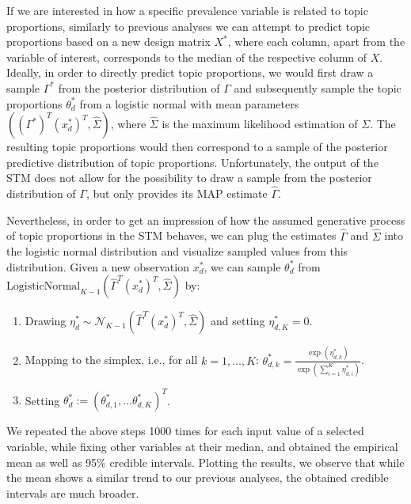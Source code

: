 If we are interested in how a specific prevalence variable is related to topic proportions, similarly to previous analyses we can attempt to predict topic proportions based on a new design matrix $X^*$, where each column, apart from the variable of interest, corresponds to the median of the respective column of $X$. Ideally, in order to directly predict topic proportions, we would first draw a sample $\Gamma^*$ from the posterior distribution of $\Gamma$ and subsequently sample the topic proportions $\theta_d^*$ from a logistic normal with mean parameters $((\Gamma^*)^T (x_d^*)^T, \hat{\Sigma})$, where $\hat{\Sigma}$ is the maximum likelihood estimation of $\Sigma$. The resulting topic proportions would then correspond to a sample of the posterior predictive distribution of topic proportions. Unfortunately, the output of the STM does not allow for the possibility to draw a sample from the posterior distribution of $\Gamma$, but only provides its MAP estimate $\hat{\Gamma}$. 

Nevertheless, in order to get an impression of how the assumed generative process of topic proportions in the STM behaves, we can plug the estimates $\hat{\Gamma}$ and $\hat{\Sigma}$ into the logistic normal distribution and visualize sampled values from this distribution. Given a new observation $x_d^*$, we can sample $\theta_d^*$ from $\text{LogisticNormal}_{K-1}(\hat{\Gamma}^T(x_d^*)^T, \hat{\Sigma})$ by:

\begin{enumerate}
\item Drawing $\eta_d^* \sim \mathcal{N}_{K-1}(\hat{\Gamma}^T(x_d^*)^T, \hat{\Sigma})$ and setting $\eta^*_{d,K} = 0$.
\item Mapping to the simplex, i.e., for all $k = 1,\dots,K$: $\theta_{d,k}^* = \frac{\exp(\eta^*_{d,k})}{\exp(\sum_{i=1}^{K} \eta^*_{d,i})}$.
\item Setting $\theta_d^* := (\theta_{d,1}^*, \dots \theta_{d,K}^*)^T$.
\end{enumerate}

We repeated the above steps 1000 times for each input value of a selected variable, while fixing other variables at their median, and obtained the empirical mean as well as 95\% credible intervals. Plotting the results, we observe that while the mean shows a similar trend to our previous analyses, the obtained credible intervals are much broader.

